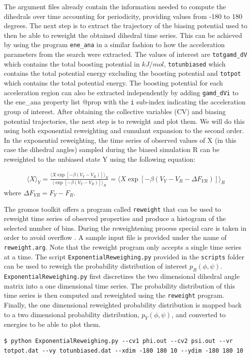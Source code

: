 The argument files already contain the information needed to compute the dihedrals over time accounting for periodicity, providing values from -180 to 180 degrees.
The next step is to extract the trajectory of the biasing potential used to then be able to reweight the obtained dihedral time series. This can be achieved by using the program \texttt{ene\_ana} in a similar fashion to how the acceleration parameters from the search were extracted. The values of interest are \texttt{totgamd\_dV} which contains the total boosting potential in $kJ/mol$, \texttt{totunbiased} which contains the total potential energy excluding the boosting potential and \texttt{totpot} which contains the total potential energy. The boosting potential for each acceleration region can also be extracted independently by adding \texttt{gamd\_dVi} to the ene\_ana property list  @prop with the \texttt{i} sub-index indicating the acceleration group of interest.
After obtaining the collective variables (CV) and biasing potential trajectories, the next step is to reweight and plot them. We will do this using both exponential reweighting and cumulant expansion to the second order.
In the exponential reweighting, the time series of observed values of X (in this case the dihedral angles) sampled during the biased simulation R can be reweighted to the unbiased state Y using the following equation:

\begin{equation}
  \begin{aligned}
 \langle X \rangle_Y = \frac {\langle X \exp \left[-\beta \left (V_Y - V_R \right) \right] \rangle_R} {\langle \exp \left[-\beta \left (V_Y - V_R \right) \right] \rangle_R} = \langle X \exp \left[-\beta \left (V_Y - V_R -\Delta F_{YR} \right) \right] \rangle_R
\end{aligned}
\end{equation}
where $\Delta F_{YR} = F_{Y} - F_{R}$.

The gromos toolkit offers a program called \texttt{reweight} that can be used to reweight time series of observed properties and produce a histogram of the selected number of bins. During the reweightening process special care is taken in order to avoid overflow \cite{berg2003multicanonical}. A sample input file is provided under the name of \texttt{reweight.arg}. Note that the reweight program only accepts a single time series at a time. The script \texttt{ExponentialReweighing.py} provided in the \texttt{scripts} folder can be used to reweigh the probability distribution of interest $p_{R}(\phi, \psi)$. \texttt{ExponentialReweighing.py} first discretizes the two dimensional dihedral angle matrix into a one dimensional time series. The probability distribution of this time series is then computed and reweighted using the \texttt{reweight} program. Finally, the one dimensional reweighted probability distribution is mapped back to a two dimensional probability distribution, $p_{Y}(\phi, \psi)$, and converted to energies to be able to plot them.
 \begin{lstlisting}
$ python ExponentialReweighing.py --cv1 phi.out --cv2 psi.out --vr totpot.dat --vy totunbiased.dat --xdim -180 180 10 --ydim -180 180 10
\end{lstlisting}

